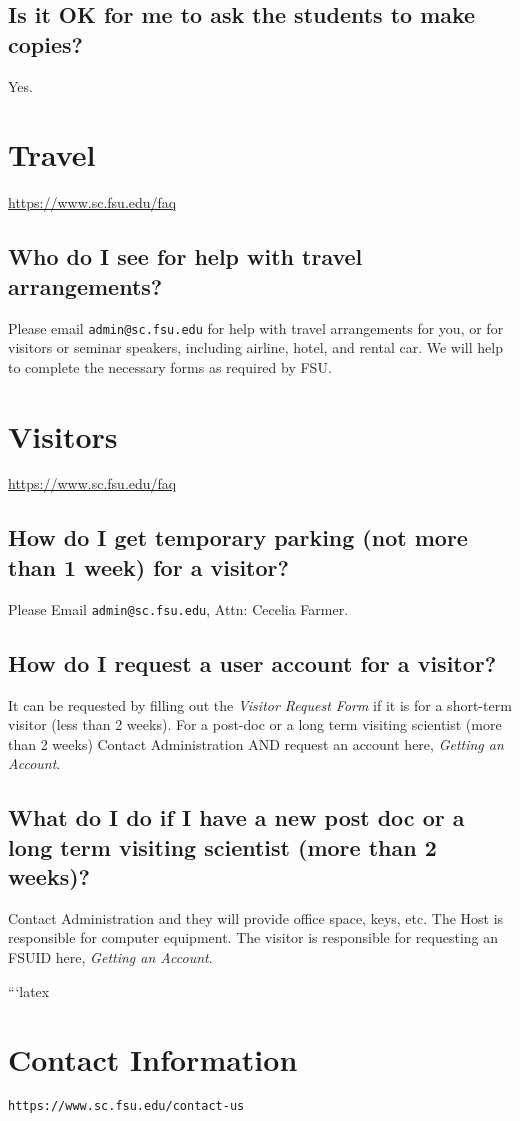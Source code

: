 \documentclass[12pt,a4paper]{article}
\begin{document}
\subsection{Is it OK for me to ask the students to make copies?}
Yes.

\section{Travel}
\url{https://www.sc.fsu.edu/faq}
\subsection{Who do I see for help with travel arrangements?}
Please email \texttt{admin@sc.fsu.edu} for help with travel arrangements for you, or for visitors or seminar speakers, including airline, hotel, and rental car. We will help to complete the necessary forms as required by FSU.

\section{Visitors}
\url{https://www.sc.fsu.edu/faq}
\subsection{How do I get temporary parking (not more than 1 week) for a visitor?}
Please Email \texttt{admin@sc.fsu.edu}, Attn: Cecelia Farmer.

\subsection{How do I request a user account for a visitor?}
It can be requested by filling out the \textit{Visitor Request Form} if it is for a short-term visitor (less than 2 weeks). For a post-doc or a long term visiting scientist (more than 2 weeks) Contact Administration AND request an account here, \textit{Getting an Account}.

\subsection{What do I do if I have a new post doc or a long term visiting scientist (more than 2 weeks)?}
Contact Administration and they will provide office space, keys, etc. The Host is responsible for computer equipment. The visitor is responsible for requesting an FSUID here, \textit{Getting an Account}.

```latex
\section{Contact Information}
\texttt{https://www.sc.fsu.edu/contact-us}
\end{document}
